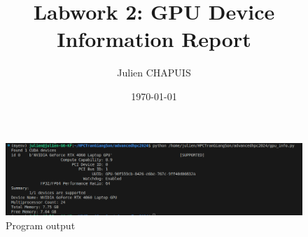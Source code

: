 \documentclass[a4paper,12pt]{article}
\title{Labwork 2: GPU Device Information Report}
\author{Julien CHAPUIS}
\date{\today}
\begin{document}
\maketitle
\begin{figure}[h]
    \centering
    \includegraphics[width=1.25\textwidth]{screenGPU.png}
    \caption{Program output}
    \label{fig:mesh1}
\end{figure}
\end{document}
